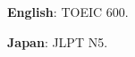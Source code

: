 \begin{cvempty} %
  \begin{cvitems} %
    \item {\textbf{English}: TOEIC 600.}
    \item {\textbf{Japan}: JLPT N5.}
  \end{cvitems}

\end{cvempty}


